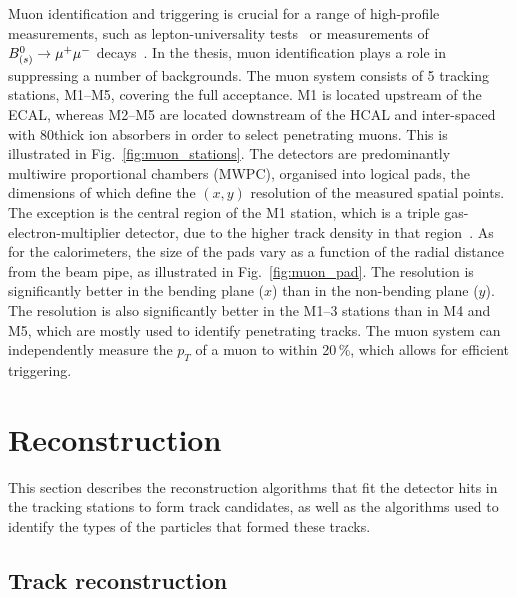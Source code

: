 Muon identification and triggering is crucial for a range of high-profile \lhcb measurements, such as lepton-universality tests~\cite{LHCb-PAPER-2019-009,LHCb-PAPER-2020-002} or measurements of  $B^0_{(s)}\rightarrow{\ensuremath{\mu^+}} \mu^-$ decays~\cite{LHCb-PAPER-2017-001}. In the thesis, muon identification plays a role in suppressing a number of backgrounds. The \lhcb muon system consists of 5 tracking stations, M1--M5, covering the full \lhcb acceptance. M1 is located upstream of the ECAL, whereas M2--M5 are located downstream of the HCAL and inter-spaced with 80\cm thick ion absorbers in order to select penetrating muons. This is illustrated in Fig.~\ref{fig:muon_stations}. The detectors are predominantly multiwire proportional chambers (MWPC), organised into logical pads, the dimensions of which define the $(x, y)$ resolution of the measured spatial points. The exception is the central region of the M1 station, which is a triple gas-electron-multiplier detector, due to the higher track density in that region~\cite{LHCb-TDR-5-add-2}. As for the calorimeters, the size of the pads vary as a function of the radial distance from the beam pipe, as illustrated in Fig.~\ref{fig:muon_pad}. The resolution is significantly better in the bending plane ($x$) than in the non-bending plane ($y$). The resolution is also significantly better in the M1--3 stations than in M4 and M5, which are mostly used to identify penetrating tracks. The muon system can independently measure the $p_T$ of a muon to within 20\,\%, which allows for efficient triggering.



\section{Reconstruction} %
\label{sec:reconstruction}

This section describes the reconstruction algorithms that fit the detector hits in the tracking stations to form track candidates, as well as the algorithms used to identify the types of the particles that formed these tracks.


\subsection{Track reconstruction} %
\label{sub:track_reconstruction}

